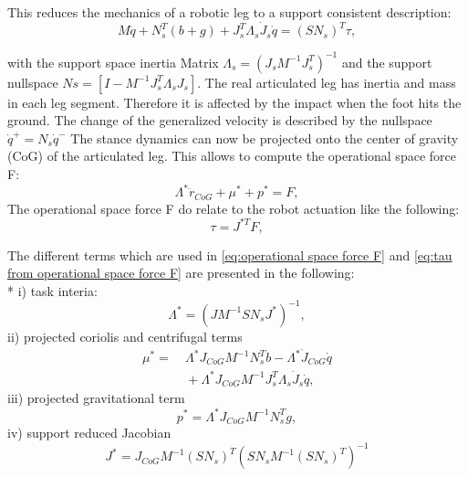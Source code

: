 \documentclass[10pt,conference]{IEEEtran}
\begin{document}
This reduces the mechanics of a robotic leg to a support consistent description:
\begin{equation}
   M \ddot{q} + {N}_{s}^{T}(b + g) + {J}_{s}^{T} {\Lambda}_{s} {\dot{J}}_{s} \dot{q} = {(S {N}_{s})}^{T} \tau,
\end{equation}

with the support space inertia Matrix \({\Lambda}_{s} = {({J}_{s} {M}^{-1} {J}_{s}^{T})}^{-1}\) and the support nullspace 
\({N}{s}=[I-{M}^{-1} {J}_{s}^{T} {\Lambda}_{s} {J}_{s}]\). The real articulated leg has inertia and mass in each leg segment. Therefore it is affected 
by the impact when the foot hits the ground. The change of the generalized velocity is described by the nullspace \({\dot{q}}^{+}={N}_{s} {\dot{q}}^{-}\)
The stance dynamics can now be projected onto the center of gravity (CoG) of the articulated leg. This allows to compute the operational space force F:
\begin{equation}
   {\Lambda}^{*} {\ddot{r}}_{CoG} + {\mu}^{*} + {p}^{*} = F, 
   \label{eq:operational space force F}
\end{equation}
The operational space force F do relate to the robot actuation like the following:
\begin{equation}
   \tau = {J}^{*T}F,
   \label{eq:tau from operational space force F}
\end{equation}

The different terms which are used in \ref{eq:operational space force F} and \ref{eq:tau from operational space force F} are presented in the following:\\* 
i) task interia: 
\begin{equation}
   {\Lambda}^{*} = {(J {M}^{-1} S {N}_{s} {J}^{*})}^{-1}, 
\end{equation}
ii) projected coriolis and centrifugal terms
\begin{equation}
\begin{aligned}
   {\mu}^{*} = & \ {\Lambda}^{*} {J}_{CoG} {M}^{-1} {N}_{s}^{T} b - {\Lambda}^{*} {\dot{J}}_{CoG} \dot{q} \\
   & \ + {\Lambda}^{*} {J}_{CoG} {M}^{-1} {J}_{s}^{T} {\Lambda}_{s} {\dot{J}}_{s} \dot{q},\
\end{aligned}
\end{equation}
iii) projected gravitational term
\begin{equation}
   {p}^{*} = {\Lambda}^{*} {J}_{CoG} {M}^{-1} {N}_{s}^{T} g,
\end{equation}
iv) support reduced Jacobian
\begin{equation}
   {J}^{*} = {J}_{CoG} {M}^{-1} {(S {N}_{s})}^{T} {(S {N}_{s} {M}^{-1} {(S {N}_{s})}^{T})}^{-1}
\end{equation}
\end{document}
